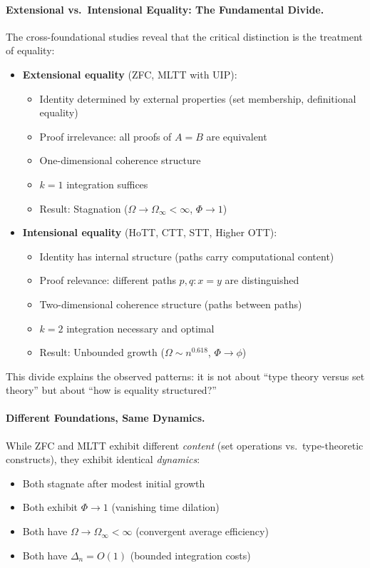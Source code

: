\documentclass[11pt]{article}
\theoremstyle{definition}
\theoremstyle{remark}
\begin{document}
\paragraph{Extensional vs.\ Intensional Equality: The Fundamental Divide.}

The cross-foundational studies reveal that the critical distinction is the treatment of equality:

\begin{itemize}
\item \textbf{Extensional equality} (ZFC, MLTT with UIP):
\begin{itemize}
\item Identity determined by external properties (set membership, definitional equality)
\item Proof irrelevance: all proofs of $A = B$ are equivalent
\item One-dimensional coherence structure
\item $k=1$ integration suffices
\item Result: Stagnation ($\Omega \to \Omega_\infty < \infty$, $\Phi \to 1$)
\end{itemize}

\item \textbf{Intensional equality} (HoTT, CTT, STT, Higher OTT):
\begin{itemize}
\item Identity has internal structure (paths carry computational content)
\item Proof relevance: different paths $p, q : x = y$ are distinguished
\item Two-dimensional coherence structure (paths between paths)
\item $k=2$ integration necessary and optimal
\item Result: Unbounded growth ($\Omega \sim n^{0.618}$, $\Phi \to \phi$)
\end{itemize}
\end{itemize}

This divide explains the observed patterns: it is not about ``type theory versus set theory'' but about ``how is equality structured?''

\paragraph{Different Foundations, Same Dynamics.}

While ZFC and MLTT exhibit different \emph{content} (set operations vs.\ type-theoretic constructs), they exhibit identical \emph{dynamics}:
\begin{itemize}
\item Both stagnate after modest initial growth
\item Both exhibit $\Phi \to 1$ (vanishing time dilation)
\item Both have $\Omega \to \Omega_\infty < \infty$ (convergent average efficiency)
\item Both have $\Delta_n = O(1)$ (bounded integration costs)
\end{itemize}
\end{document}

